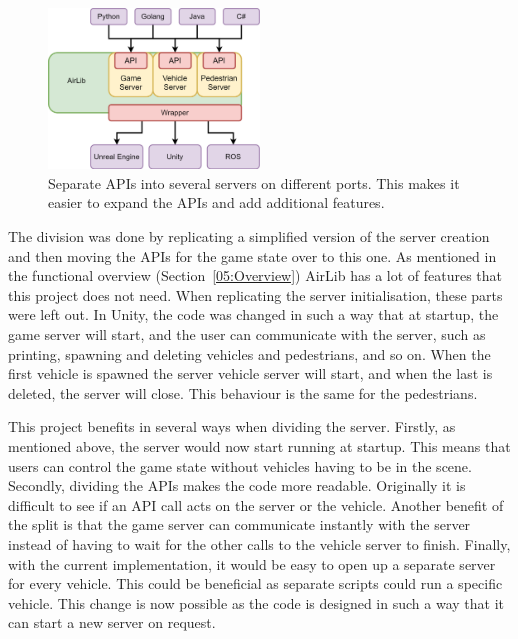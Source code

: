 \begin{figure}[h]
    \centering
    \includegraphics[width=0.5\textwidth]{05_AnalysisAndDesign/Diagrams/UpdatedOverview.png}
    \caption[Updated overview of AirSim]{Separate APIs into several servers on different ports. This makes it easier to expand the APIs and add additional features.}\label{05:SplitServer}
\end{figure}

The division was done by replicating a simplified version of the server creation and then moving the APIs for the game state over to this one. As mentioned in the functional overview (Section~\ref{05:Overview}) AirLib has a lot of features that this project does not need. When replicating the server initialisation, these parts were left out. In Unity, the code was changed in such a way that at startup, the game server will start, and the user can communicate with the server, such as printing, spawning and deleting vehicles and pedestrians, and so on. When the first vehicle is spawned the server vehicle server will start, and when the last is deleted, the server will close. This behaviour is the same for the pedestrians. 

This project benefits in several ways when dividing the server. Firstly, as mentioned above, the server would now start running at startup. This means that users can control the game state without vehicles having to be in the scene. Secondly, dividing the APIs makes the code more readable. Originally it is difficult to see if an API call acts on the server or the vehicle. Another benefit of the split is that the game server can communicate instantly with the server instead of having to wait for the other calls to the vehicle server to finish. Finally, with the current implementation, it would be easy to open up a separate server for every vehicle. This could be beneficial as separate scripts could run a specific vehicle. This change is now possible as the code is designed in such a way that it can start a new server on request. 

